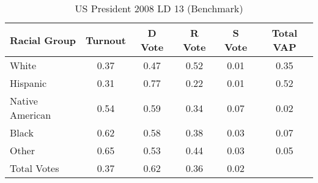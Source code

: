 \begin{table}[htb]
\begin{center}
\caption{US President 2008 LD 13 (Benchmark)}
\label{pres08_vap_ld_13_benchmark}
\begin{tabular}{lccccc}
  \hline
Racial Group & Turnout & D Vote & R Vote & S Vote & Total VAP \\ 
  \hline
White & 0.37 & 0.47 & 0.52 & 0.01 & 0.35 \\ 
  Hispanic & 0.31 & 0.77 & 0.22 & 0.01 & 0.52 \\ 
  Native American & 0.54 & 0.59 & 0.34 & 0.07 & 0.02 \\ 
  Black & 0.62 & 0.58 & 0.38 & 0.03 & 0.07 \\ 
  Other & 0.65 & 0.53 & 0.44 & 0.03 & 0.05 \\ 
  Total Votes & 0.37 & 0.62 & 0.36 & 0.02 &  \\ 
   \hline
\end{tabular}
\end{center}
\end{table}
